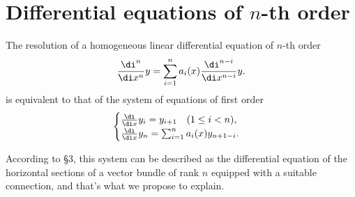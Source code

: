 \clearpage
\section{Differential equations of $n$-th order}
\begin{para}
  The resolution of a homogeneous linear differential equation of $n$-th order
  \begin{equation}\label{eq:4.1.1}
    \frac{\di^n}{\di x^n}y = \sum_{i=1}^n a_i(x)\frac{\di^{n-i}}{\di x^{n-i}}y.
  \end{equation}
  is equivalent to that of the system of equations of first order
  \begin{equation}\label{eq:4.1.2}
    \begin{cases}
      \frac{\di}{\di x}y_i = y_{i+1} \quad(1\le i< n),\\
      \frac{\di}{\di x}y_n = \sum_{i=1}^na_i(x)y_{n+1-i}.
    \end{cases}
  \end{equation}

  According to \S 3, this system can be described as the differential equation
  of the horizontal sections of a vector bundle of rank $n$ equipped with a
  suitable connection, and that's what we propose to explain.
\end{para}
